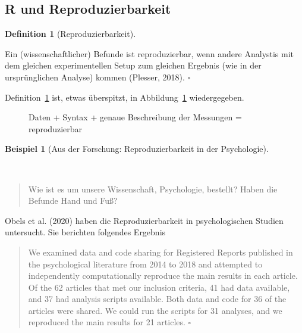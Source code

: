 \documentclass[
  a4paper,
]{scrbook}
\theoremstyle{definition}
\newtheorem{example}{Beispiel}[chapter]
\theoremstyle{definition}
\newtheorem{definition}{Definition}[chapter]
\theoremstyle{definition}
\theoremstyle{remark}
\begin{document}
\subsection{R und Reproduzierbarkeit}\label{r-und-reproduzierbarkeit}

\begin{definition}[Reproduzierbarkeit]\protect\hypertarget{def-repro}{}\label{def-repro}

Ein (wissenschaftlicher) Befunde ist reproduzierbar, wenn andere
Analystis mit dem gleichen experimentellen Setup zum gleichen Ergebnis
(wie in der ursprünglichen Analyse) kommen (Plesser, 2018). \(\square\)

\end{definition}

Definition~\ref{def-repro} ist, etwas überspitzt, in
Abbildung~\ref{fig-repro} wiedergegeben.

\begin{figure}


\caption{\label{fig-repro}Daten + Syntax + genaue Beschreibung der
Messungen = reproduzierbar}

\end{figure}%

\begin{example}[Aus der Forschung: Reproduzierbarkeit in der
Psychologie]\protect\hypertarget{exm-repro}{}\label{exm-repro}

~

\begin{quote}
{} Wie ist es um unsere Wissenschaft, Psychologie,
bestellt? Haben die Befunde Hand und Fuß?
\end{quote}

Obels et al. (2020) haben die Reproduzierbarkeit in psychologischen
Studien untersucht. Sie berichten folgendes Ergebnis

\begin{quote}
We examined data and code sharing for Registered Reports published in
the psychological literature from 2014 to 2018 and attempted to
independently computationally reproduce the main results in each
article. Of the 62 articles that met our inclusion criteria, 41 had data
available, and 37 had analysis scripts available. Both data and code for
36 of the articles were shared. We could run the scripts for 31
analyses, and we reproduced the main results for 21 articles.
\(\square\)
\end{quote}

\end{example}
\end{document}
